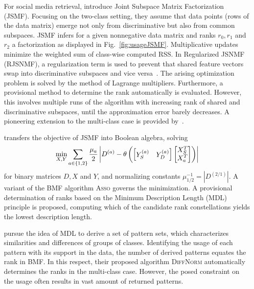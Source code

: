 For social media retrieval, \cite{gupta2010nonnegative} introduce Joint Subspace Matrix Factorization (JSMF). Focusing on the two-class setting, they assume that data points (rows of the data matrix) emerge not only from discriminative but also from common subspaces. JSMF infers for a given nonnegative data matrix and ranks $r_0,r_1$ and $r_2$ a factorization as displayed in Fig.~\ref{fig:usageJSMF}. Multiplicative updates minimize the weighted sum of class-wise computed RSS.
In Regularized JSNMF (RJSNMF), a regularization term is used to prevent that shared feature vectors swap into discriminative subspaces and vice versa~\citep{gupta2013regularized}. The arising optimization problem is solved by the method of Lagrange multipliers. Furthermore, a provisional method to determine the rank automatically is evaluated. However, this involves multiple runs of the algorithm with increasing rank of shared and discriminative subspaces, until the approximation error barely decreases.
A pioneering extension to the multi-class case  is provided by~\cite{gupta2014matrix}.

\cite{miettienen2012finding} transfers the objective of JSMF into Boolean algebra, solving
\[\min_{X,Y}\sum_{a\in\{1,2\}}\frac{\mu_a}{2}\left|D^{(a)}-\theta\left(\begin{bmatrix}
Y^{(a)}_{S} & Y^{(a)}_D
\end{bmatrix} \begin{bmatrix}
	X_S^T\\
    X_a^T
\end{bmatrix}\right)\right|\]
for binary matrices $D, X$ and $Y$, and normalizing constants $\mu_{1/2}^{-1} =|D^{(2/1)}|$.  A variant of the BMF algorithm \textsc{Asso} governs the minimization. A provisional determination of ranks based on the Minimum Description Length (MDL) principle is proposed, computing which of the candidate rank constellations yields the lowest description length.

\cite{vreeken2007characterising} pursue the idea of MDL to derive a set of pattern sets, which characterizes similarities and differences of groups of classes. Identifying the usage of each pattern with its support in the data, the number of derived patterns equates the rank in BMF. In this respect, their proposed algorithm \textsc{DiffNorm} automatically determines the ranks in the multi-class case. However, the posed constraint on the usage often results in vast amount of returned patterns.    

